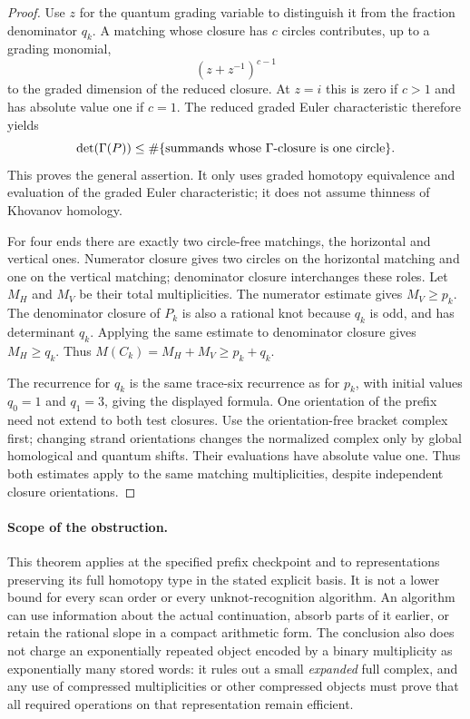 \documentclass[11pt,a4paper]{article}
\theoremstyle{definition}
\theoremstyle{remark}
\numberwithin{equation}{section}
\begin{document}
\begin{proof}
Use $z$ for the quantum grading variable to distinguish it from the
fraction denominator $q_k$.  A matching whose closure has $c$
circles contributes, up to a grading monomial,
\[
 (z+z^{-1})^{c-1}
\]
to the graded dimension of the reduced closure.  At $z=i$ this is
zero if $c>1$ and has absolute value one if $c=1$.  The reduced
graded Euler characteristic therefore yields
\[
 \det(\Gamma(P))\le
 \#\{\hbox{summands whose $\Gamma$-closure is one circle}\}.
\]
This proves the general assertion.  It only uses graded homotopy
equivalence and evaluation of the graded Euler characteristic; it
does not assume thinness of Khovanov homology.

For four ends there are exactly two circle-free matchings, the
horizontal and vertical ones.  Numerator closure gives two circles
on the horizontal matching and one on the vertical matching;
denominator closure interchanges these roles.  Let $M_H$ and $M_V$
be their total multiplicities.  The numerator estimate gives
$M_V\ge p_k$.  The denominator closure of $P_k$ is also a rational
knot because $q_k$ is odd, and has determinant $q_k$.  Applying the
same estimate to denominator closure gives $M_H\ge q_k$.  Thus
$M(C_k)=M_H+M_V\ge p_k+q_k$.

The recurrence for $q_k$ is the same trace-six recurrence as for
$p_k$, with initial values $q_0=1$ and $q_1=3$, giving the displayed
formula.  One orientation of the prefix need not extend to both test closures.
Use the orientation-free bracket complex first; changing strand orientations
changes the normalized complex only by global homological and quantum shifts.
Their evaluations have absolute value one. Thus both estimates apply to
the same matching multiplicities, despite independent closure orientations.
\end{proof}

\paragraph{Scope of the obstruction.}
This theorem applies at the specified prefix checkpoint and to
representations preserving its full homotopy type in the stated
explicit basis.  It is not a lower bound for every scan order or
every unknot-recognition algorithm.  An algorithm can use information
about the actual continuation, absorb parts of it earlier, or retain
the rational slope in a compact arithmetic form.  The conclusion
also does not charge an exponentially repeated object encoded by a
binary multiplicity as exponentially many stored words: it rules
out a small \emph{expanded} full complex, and any use of compressed
multiplicities or other compressed objects must prove that all
required operations on that representation remain efficient.
\end{document}
